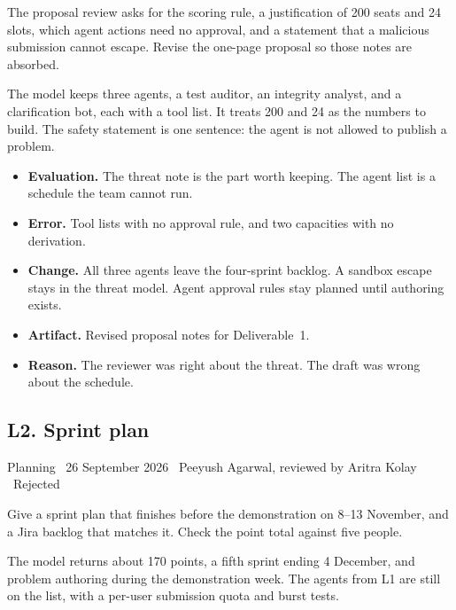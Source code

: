 \documentclass[11pt,a4paper]{article}
\newcommand{\meta}[1]{{\footnotesize\color{quiet}#1}\par\vspace{0.2em}}
\newcommand{\step}[1]{\par\vspace{0.45em}{\bfseries #1}\par\vspace{0.05em}}
\begin{document}
\step{1. Prompt}
The proposal review asks for the scoring rule, a justification of 200 seats and 24 slots, which agent actions need no approval, and a statement that a malicious submission cannot escape. Revise the one-page proposal so those notes are absorbed.

\step{2. Reply (summarised)}
The model keeps three agents, a test auditor, an integrity analyst, and a clarification bot, each with a tool list. It treats 200 and 24 as the numbers to build. The safety statement is one sentence: the agent is not allowed to publish a problem.

\step{3. Decision}
\begin{itemize}
\item \textbf{Evaluation.} The threat note is the part worth keeping. The agent list is a schedule the team cannot run.
\item \textbf{Error.} Tool lists with no approval rule, and two capacities with no derivation.
\item \textbf{Change.} All three agents leave the four-sprint backlog. A sandbox escape stays in the threat model. Agent approval rules stay planned until authoring exists.
\item \textbf{Artifact.} Revised proposal notes for Deliverable~1.
\item \textbf{Reason.} The reviewer was right about the threat. The draft was wrong about the schedule.
\end{itemize}

\subsection{L2. Sprint plan}
\meta{Planning \textperiodcentered\ 26 September 2026 \textperiodcentered\ Peeyush Agarwal, reviewed by Aritra Kolay \textperiodcentered\ Rejected}

\step{1. Prompt}
Give a sprint plan that finishes before the demonstration on 8--13 November, and a Jira backlog that matches it. Check the point total against five people.

\step{2. Reply (summarised)}
The model returns about 170 points, a fifth sprint ending 4 December, and problem authoring during the demonstration week. The agents from L1 are still on the list, with a per-user submission quota and burst tests.
\end{document}

